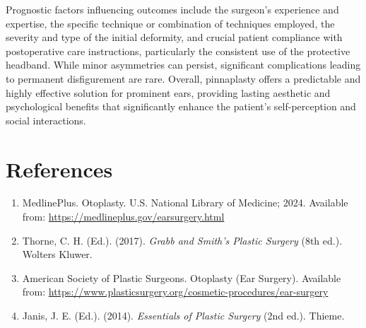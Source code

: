 Prognostic factors influencing outcomes include the surgeon's experience and expertise, the specific technique or combination of techniques employed, the severity and type of the initial deformity, and crucial patient compliance with postoperative care instructions, particularly the consistent use of the protective headband. While minor asymmetries can persist, significant complications leading to permanent disfigurement are rare. Overall, pinnaplasty offers a predictable and highly effective solution for prominent ears, providing lasting aesthetic and psychological benefits that significantly enhance the patient's self-perception and social interactions.

\section*{References}
\begin{enumerate}
  \item MedlinePlus. Otoplasty. U.S. National Library of Medicine; 2024. Available from: \url{https://medlineplus.gov/earsurgery.html}
  \item Thorne, C. H. (Ed.). (2017). \textit{Grabb and Smith's Plastic Surgery} (8th ed.). Wolters Kluwer.
  \item American Society of Plastic Surgeons. Otoplasty (Ear Surgery). Available from: \url{https://www.plasticsurgery.org/cosmetic-procedures/ear-surgery}
  \item Janis, J. E. (Ed.). (2014). \textit{Essentials of Plastic Surgery} (2nd ed.). Thieme.
\end{enumerate}

\clearpage
